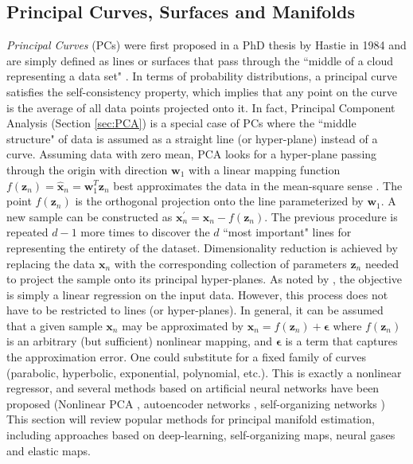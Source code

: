 \subsection{Principal Curves, Surfaces and Manifolds} \label{sec:Principal_Manifolds}
\textit{Principal Curves} (PCs) were first proposed in a PhD thesis by Hastie in 1984 and are simply defined as lines or surfaces that pass through the ``middle of a cloud representing a data set" \citep{Kegl2008PrincipalManifoldsTextbook,Gorban2007ElasticMaps}.  In terms of probability distributions, a principal curve satisfies the self-consistency property, which implies that any point on the curve is the average of all data points projected onto it.  In fact, Principal Component Analysis (Section \ref{sec:PCA}) is a special case of PCs where the ``middle structure" of data is assumed as a straight line (or hyper-plane) instead of a curve.  Assuming data with zero mean, PCA looks for a hyper-plane passing through the origin with direction $\bm{w}_{1}$ with a linear mapping function $f(\bm{z}_{n}) = \hat{\bm{x}}_{n} = \bm{w}^{T}_{1}\bm{z}_{n}$ best approximates the data in the mean-square sense \citep{Sorzano2014DRReview, Murphy2012}.  The point $f(\bm{z}_{n})$  is the orthogonal projection onto the line parameterized by $\bm{w}_{1}$.  A new sample can be constructed as $\bm{x}^{'}_{n} = \bm{x}_{n} - f(\bm{z}_{n})$.  The previous procedure is repeated $d-1$ more times to discover the $d$ ``most important" lines for representing the entirety of the dataset.  Dimensionality reduction is achieved by replacing the data $\bm{x}_{n}$ with the corresponding collection of parameters $\bm{z}_{n}$ needed to project the sample onto its principal hyper-planes.  As noted by \cite{Sorzano2014DRReview}, the objective is simply a linear regression on the input data.  However, this process does not have to be restricted to lines (or hyper-planes).  In general, it can be assumed that a given sample $\bm{x}_{n}$ may be approximated by $\bm{x}_{n} = f(\bm{z}_{n}) + \bm{\epsilon}$ where $f(\bm{z}_{n})$ is an arbitrary (but sufficient) nonlinear mapping, and $\bm{\epsilon}$ is a term that captures the approximation error.   One could substitute for a fixed family of curves (parabolic, hyperbolic, exponential, polynomial, etc.).  This is exactly a nonlinear regressor, and several methods based on artificial neural networks have been proposed (Nonlinear PCA \citep{Kramer1991NonlinearPCA}, autoencoder networks \citep{Goodfellow2016DeepLearning}, self-organizing networks \citep{Kohonen1990SOM,Fritzke1995GrowingNeuralGas})  This section will review popular methods for principal manifold estimation, including approaches based on deep-learning, self-organizing maps, neural gases and elastic maps. 

